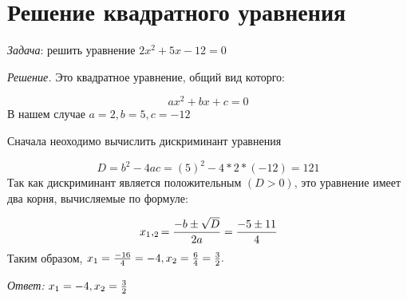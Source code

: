 \documentclass[12pt]{article}
\begin{document}
\section{Решение квадратного уравнения}
\textit{Задача}: решить уравнение $2x^2 + 5x - 12 = 0$

\textit{Решение.} Это квадратное уравнение, общий вид которго:

\[ax^2 + bx + c = 0\]
В нашем случае $a = 2, b = 5, c = -12$

Сначала неоходимо вычислить дискриминант уравнения

\[D = b^2 - 4ac = (5)^2 - 4 * 2 * (-12) = 121\]
Так как дискриминант является положительным $(D > 0)$, это уравнение имеет два корня, вычисляемые по формуле:

\[ x_1,_2 = {-b\pm\sqrt{D}\over{2a}} = {-5 \pm11\over{4}}\]
Таким образом, $x_1 = {-16\over{4}} = -4, x_2 = {6\over{4}} = {3\over{2}}.$

\textit{Ответ:} $x_1 = -4, x_2 = {3\over{2}}$ 
\end{document}
